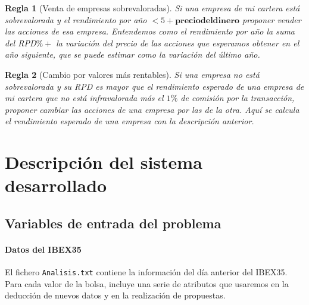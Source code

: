 \documentclass[11pt,leqno]{article}
\theoremstyle{definition_wo_parentheses}
\theoremstyle{plain}
\newtheorem{regla}{Regla}[subsection]
\theoremstyle{remark}
\begin{document}
\begin{regla}[Venta de empresas sobrevaloradas]
	Si una empresa de mi cartera está sobrevalorada y el rendimiento por año $<5 +\mathbf{precio del dinero}$ proponer vender las acciones de esa empresa. Entendemos como el rendimiento por año la suma del RPD$\% +$ la variación del precio de las acciones que esperamos obtener en el año siguiente, que se puede estimar como la variación del último año.
\end{regla}	

\begin{regla}[Cambio por valores más rentables]
	 Si una empresa no está sobrevalorada y su RPD es mayor que el rendimiento esperado de una empresa de mi cartera que no está infravalorada más el $1\%$ de comisión por la transacción, proponer cambiar las acciones de una empresa por las de la otra. Aquí se calcula el rendimiento esperado de una empresa con la descripción anterior.
\end{regla}

\section{Descripción del sistema desarrollado}

\subsection{Variables de entrada del problema}

	\paragraph{Datos del IBEX35} El fichero \texttt{Analisis.txt} contiene la información del día anterior del IBEX35. Para cada valor de la bolsa, incluye una serie de atributos que usaremos en la deducción de nuevos datos y en la realización de propuestas.
	
\end{document}
